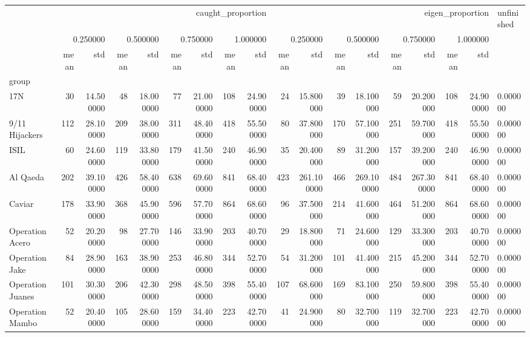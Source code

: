 \begin{tabular}{lrrrrrrrrrrrrrrrrl}
 & \multicolumn{8}{r}{caught_proportion} & \multicolumn{8}{r}{eigen_proportion} & unfinished \\
 & \multicolumn{2}{r}{0.250000} & \multicolumn{2}{r}{0.500000} & \multicolumn{2}{r}{0.750000} & \multicolumn{2}{r}{1.000000} & \multicolumn{2}{r}{0.250000} & \multicolumn{2}{r}{0.500000} & \multicolumn{2}{r}{0.750000} & \multicolumn{2}{r}{1.000000} &  \\
 & mean & std & mean & std & mean & std & mean & std & mean & std & mean & std & mean & std & mean & std &  \\
group &  &  &  &  &  &  &  &  &  &  &  &  &  &  &  &  &  \\
17N & 30 & 14.500000 & 48 & 18.000000 & 77 & 21.000000 & 108 & 24.900000 & 24 & 15.800000 & 39 & 18.100000 & 59 & 20.200000 & 108 & 24.900000 & 0.000000 \\
9/11 Hijackers & 112 & 28.100000 & 209 & 38.000000 & 311 & 48.400000 & 418 & 55.500000 & 80 & 37.800000 & 170 & 57.100000 & 251 & 59.700000 & 418 & 55.500000 & 0.000000 \\
ISIL & 60 & 24.600000 & 119 & 33.800000 & 179 & 41.500000 & 240 & 46.900000 & 35 & 20.400000 & 89 & 31.200000 & 157 & 39.200000 & 240 & 46.900000 & 0.000000 \\
Al Qaeda & 202 & 39.100000 & 426 & 58.400000 & 638 & 69.600000 & 841 & 68.400000 & 423 & 261.100000 & 466 & 269.100000 & 484 & 267.300000 & 841 & 68.400000 & 0.000000 \\
Caviar & 178 & 33.900000 & 368 & 45.900000 & 596 & 57.700000 & 864 & 68.600000 & 96 & 37.500000 & 214 & 41.600000 & 464 & 51.200000 & 864 & 68.600000 & 0.000000 \\
Operation Acero & 52 & 20.200000 & 98 & 27.700000 & 146 & 33.900000 & 203 & 40.700000 & 29 & 18.800000 & 71 & 24.600000 & 129 & 33.300000 & 203 & 40.700000 & 0.000000 \\
Operation Jake & 84 & 28.900000 & 163 & 38.900000 & 253 & 46.800000 & 344 & 52.700000 & 54 & 31.200000 & 101 & 41.400000 & 215 & 45.200000 & 344 & 52.700000 & 0.000000 \\
Operation Juanes & 101 & 30.300000 & 206 & 42.300000 & 298 & 48.500000 & 398 & 55.400000 & 107 & 68.600000 & 169 & 83.100000 & 250 & 59.800000 & 398 & 55.400000 & 0.000000 \\
Operation Mambo & 52 & 20.400000 & 105 & 28.600000 & 159 & 34.400000 & 223 & 42.700000 & 41 & 24.900000 & 80 & 32.700000 & 119 & 32.700000 & 223 & 42.700000 & 0.000000 \\

\end{tabular}

